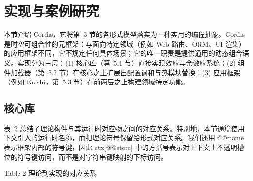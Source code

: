 \documentclass[
  10
]{article}
\begin{document}
\section{实现与案例研究} \label{implementation-and-case-study}

本节介绍 Cordis，它将第~3 节的各形式模型落实为一种实用的编程抽象。Cordis 是时空可组合性的元框架：与面向特定领域（例如 Web 路由、ORM、UI 渲染）的应用框架不同，它不规定任何具体场景；它的唯一职责是提供通用的动态组合语义。实现分为三层：(1) 核心库（第~5.1 节）直接实现效应与余效应系统；(2) 组件加载器（第~5.2 节）在核心之上扩展出配置调和与热模块替换；(3) 应用框架（例如 Koishi，第~5.3 节）在前两层之上构建领域特定功能。

\subsection{核心库} \label{core-library}

表~2 总结了理论构件与其运行时对应物之间的对应关系。特别地，本节通篇使用下文引入的运行时名称，而把理论符号保留给形式对应关系。我们还用 @@name 表示框架内部的符号键，因此 ctx{[}@@store{]} 中的方括号表示对上下文上不透明槽位的符号键访问，而不是对字符串键映射的下标访问。

Table 2 \textbar{} 理论到实现的对应关系
\end{document}
